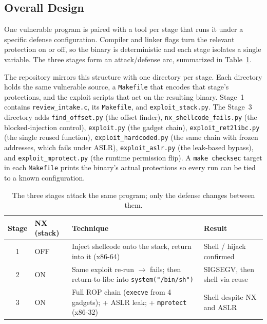 \documentclass[10pt,twocolumn,letterpaper]{article}
\newcommand{\code}[1]{\texttt{\small #1}}
\begin{document}
\subsection{Overall Design}
One vulnerable program is paired with a tool per stage that runs it under a
specific defense configuration. Compiler and linker flags turn the relevant
protection on or off, so the binary is deterministic and each stage isolates a
single variable. The three stages form an attack/defense arc, summarized in
Table~\ref{tab:stages}.

The repository mirrors this structure with one directory per stage. Each
directory holds the same vulnerable source, a \code{Makefile} that encodes that
stage's protections, and the exploit scripts that act on the resulting binary.
Stage~1 contains \code{review\_intake.c}, its \code{Makefile}, and
\code{exploit\_stack.py}. The Stage~3 directory adds \code{find\_offset.py} (the
offset finder), \code{nx\_shellcode\_fails.py} (the blocked-injection control),
\code{exploit.py} (the gadget chain), \code{exploit\_ret2libc.py} (the single
reused function), \code{exploit\_hardcoded.py} (the same chain with frozen
addresses, which fails under ASLR), \code{exploit\_aslr.py} (the leak-based
bypass), and \code{exploit\_mprotect.py} (the runtime permission flip). A
\code{make checksec} target in each \code{Makefile} prints the binary's actual
protections so every run can be tied to a known configuration.

\begin{table}[t]
  \centering
  \caption{The three stages attack the same program; only the defense changes between them.}
  \label{tab:stages}
  \small
  \begin{tabularx}{\textwidth}{@{}c l X X@{}}
    \toprule
    \textbf{Stage} & \textbf{NX (stack)} & \textbf{Technique} & \textbf{Result}\\
    \midrule
    1 & OFF & Inject shellcode onto the stack, return into it (x86-64) & Shell / hijack confirmed\\
    2 & ON  & Same exploit re-run $\rightarrow$ fails; then return-to-libc into \code{system("/bin/sh")} & SIGSEGV, then shell via reuse\\
    3 & ON  & Full ROP chain (\code{execve} from 4 gadgets); + ASLR leak; + \code{mprotect} (x86-32) & Shell despite NX and ASLR\\
    \bottomrule
  \end{tabularx}
\end{table}
\end{document}

